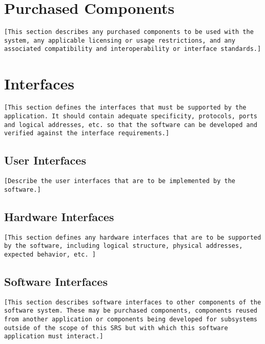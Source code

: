 \documentclass[a4paper,12pt,chapterprefix=false,bibliography=totoc,listof=totoc]{scrreprt}
\begin{document}
\section{Purchased Components}
\begin{verbatim}
[This section describes any purchased components to be used with the system, any applicable licensing or usage restrictions, and any associated compatibility and interoperability or interface standards.]
\end{verbatim}

\section{Interfaces}
\begin{verbatim}
[This section defines the interfaces that must be supported by the application. It should contain adequate specificity, protocols, ports and logical addresses, etc. so that the software can be developed and verified against the interface requirements.]
\end{verbatim}

\subsection{User Interfaces}
\begin{verbatim}
[Describe the user interfaces that are to be implemented by the software.]
\end{verbatim}

\subsection{Hardware Interfaces}
\begin{verbatim}
[This section defines any hardware interfaces that are to be supported by the software, including logical structure, physical addresses, expected behavior, etc. ]
\end{verbatim}

\subsection{Software Interfaces}
\begin{verbatim}
[This section describes software interfaces to other components of the software system. These may be purchased components, components reused from another application or components being developed for subsystems outside of the scope of this SRS but with which this software application must interact.]
\end{verbatim}
\end{document}

